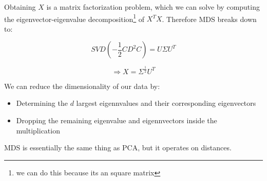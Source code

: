 Obtaining $X$ is a matrix factorization problem, which we can solve by computing the eigenvector-eigenvalue decomposition\footnote{we can do this because its an square matrix} of \(X^T X\). Therefore MDS breaks down to:

\[ \boxed{SVD(-\frac{1}{2} C D^2 C) = U \Sigma U^T}\]

\[ \Rightarrow X = \Sigma^{\frac{1}{2}} U^T \]

We can reduce the dimensionality of our data by:
\begin{itemize}
    \item Determining the \(d\) largest eigennvalues and their corresponding eigenvectors
    \item Dropping the remaining eigenvalue and eigennvectors inside the multiplication
\end{itemize}

MDS is essentially the same thing as PCA, but it operates on distances.

